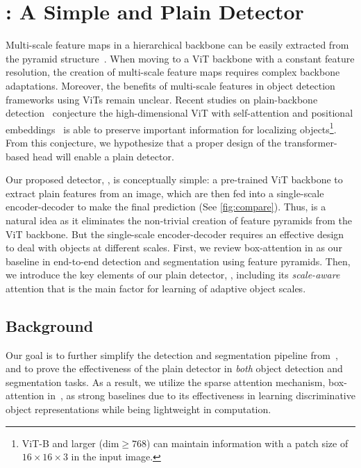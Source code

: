 
\section{\ours: A Simple and Plain Detector}
\label{sec:simplr}

Multi-scale feature maps in a hierarchical backbone can be easily extracted from the pyramid structure~\cite{wei2016ssd,tsung2017fpn,zhu2021deformable}. When moving to a ViT backbone with a constant feature resolution, the creation of multi-scale feature maps requires complex backbone adaptations. Moreover, the benefits of multi-scale features in object detection frameworks using ViTs remain unclear. Recent studies on plain-backbone detection~\cite{li2022vitdet,chen2022uvit} conjecture the high-dimensional ViT with self-attention and positional embeddings~\cite{vaswani2017transformer} is able to preserve important information for localizing objects\footnote{ViT-B and larger ($\text{dim}\ge768$) can maintain information with a patch size of $16{\times}16{\times}3$ in the input image.}. From this conjecture, we hypothesize that a proper design of the transformer-based head will enable a plain detector.

Our proposed detector, \ours, is conceptually simple: a pre-trained ViT backbone to extract plain features from an image, which are then fed into a single-scale encoder-decoder to make the final prediction (See \cref{fig:compare}). Thus, \ours is a natural idea as it eliminates the non-trivial creation of feature pyramids from the ViT backbone. But the single-scale encoder-decoder requires an effective design to deal with objects at different scales. First, we review box-attention in \cite{nguyen2022boxer} as our baseline in end-to-end detection and segmentation using feature pyramids. Then, we introduce the key elements of our plain detector, \ours, including its \emph{scale-aware} attention that is the main factor for learning of adaptive object scales.

\subsection{Background}

Our goal is to further simplify the detection and segmentation pipeline from~\cite{zhu2021deformable,li2022vitdet,nguyen2022boxer}, and to prove the effectiveness of the plain detector in \textit{both} object detection and segmentation tasks. As a result, we utilize the sparse attention mechanism, box-attention in~\cite{nguyen2022boxer}, as strong baselines due to its effectiveness in learning discriminative object representations while being lightweight in computation.

